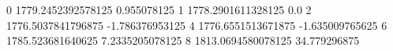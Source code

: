 0 1779.2452392578125 0.955078125
1 1778.2901611328125 0.0
2 1776.5037841796875 -1.786376953125
4 1776.6551513671875 -1.635009765625
6 1785.523681640625 7.2335205078125
8 1813.0694580078125 34.779296875
